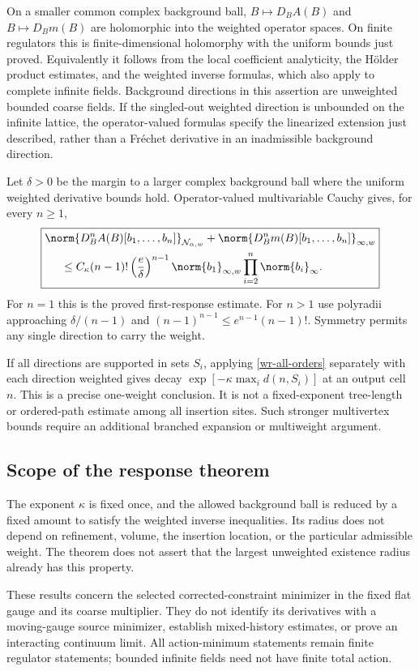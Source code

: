 On a smaller common complex background ball,
$B\mapsto D_BA(B)$ and $B\mapsto D_Bm(B)$ are holomorphic
into the weighted operator spaces. On finite regulators this is
finite-dimensional holomorphy with the uniform bounds just
proved. Equivalently it follows from the local coefficient
analyticity, the H\"older product estimates, and the weighted
inverse formulas, which also apply to complete infinite fields.
Background directions in this assertion are unweighted bounded
coarse fields. If the singled-out weighted direction is unbounded
on the infinite lattice, the operator-valued formulas specify the
linearized extension just described, rather than a Fr\'echet
derivative in an inadmissible background direction.

Let $\delta>0$ be the margin to a larger complex background ball
where the uniform weighted derivative bounds hold. Operator-valued
multivariable Cauchy gives, for every $n\ge1$,
\begin{equation}\label{wr-all-orders}
 \boxed{\begin{split}
 &\norm{D_B^n A(B)[b_1,\ldots,b_n]}_{\mathcal N_{\alpha,w}}
       +\norm{D_B^n m(B)[b_1,\ldots,b_n]}_{\infty,w}\\
 &\hspace{5mm}\le C_\kappa(n-1)!
       \left(\frac e\delta\right)^{n-1}
        \norm{b_1}_{\infty,w}\prod_{i=2}^n\norm{b_i}_\infty.
 \end{split}}
\end{equation}
For $n=1$ this is the proved first-response estimate. For $n>1$
use polyradii approaching $\delta/(n-1)$ and
$(n-1)^{n-1}\le e^{n-1}(n-1)!$. Symmetry permits any single
direction to carry the weight.

If all directions are supported in sets $S_i$, applying
\eqref{wr-all-orders} separately with each direction weighted
gives decay $\exp[-\kappa\max_i d(n,S_i)]$ at an output cell
$n$. This is a precise one-weight conclusion. It is not a
fixed-exponent tree-length or ordered-path estimate among all
insertion sites. Such stronger multivertex bounds require an
additional branched expansion or multiweight argument.

\subsection{Scope of the response theorem}
\label{wr-scope}

The exponent $\kappa$ is fixed once, and the allowed background
ball is reduced by a fixed amount to satisfy the weighted
inverse inequalities. Its radius does not depend on refinement,
volume, the insertion location, or the particular admissible
weight. The theorem does not assert that the largest unweighted
existence radius already has this property.

These results concern the selected corrected-constraint minimizer
in the fixed flat gauge and its coarse multiplier. They do not
identify its derivatives with a moving-gauge source minimizer,
establish mixed-history estimates, or prove an interacting
continuum limit. All action-minimum statements remain finite
regulator statements; bounded infinite fields need not have finite
total action.
